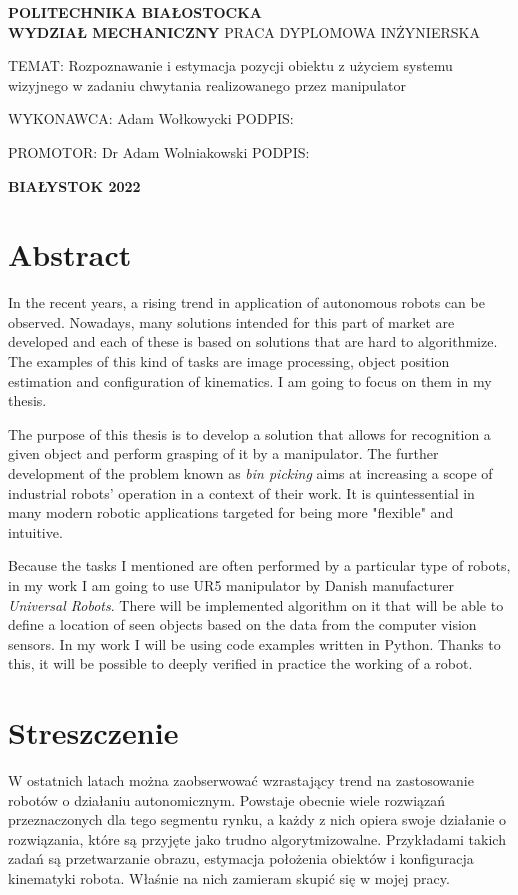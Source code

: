 \documentclass{article}
\newcommand\filling[1][4cm]{\makebox[#1]{\dotfill}}
\begin{document}
\begin{center}
\huge{\textbf{POLITECHNIKA BIAŁOSTOCKA}} \\
\LARGE{\textbf{WYDZIAŁ MECHANICZNY}} 
\vfill
\huge{PRACA DYPLOMOWA INŻYNIERSKA}
\vfill
\end{center}

\LARGE{TEMAT: Rozpoznawanie i estymacja pozycji obiektu z użyciem systemu wizyjnego w zadaniu chwytania realizowanego przez manipulator}
\vfill
\begin{flushright}
\LARGE{WYKONAWCA: Adam Wołkowycki}
\vfill
\LARGE{PODPIS: \filling[4cm]}
\vfill
\end{flushright}
\LARGE{PROMOTOR: Dr Adam Wolniakowski}
\vfill
\LARGE{PODPIS: \filling[4cm]}
\vfill
\Large{}

\begin{center}
\Large{\textbf{BIAŁYSTOK 2022}}
\end{center}
\thispagestyle{empty}

\newpage
\section*{\LARGE{Abstract}}
In the recent years, a rising trend in application of autonomous robots can be observed. Nowadays, many solutions intended for this part of market are developed and each of these is based on solutions that are hard to algorithmize. The examples of this kind of tasks are image processing, object position estimation and configuration of kinematics. I am going to focus on them in my thesis.

The purpose of this thesis is to develop a solution that allows for recognition a given object and perform grasping of it by a manipulator. The further development of the problem known as \emph{bin picking} aims at increasing a scope of industrial robots' operation in a context of their work. It is quintessential in many modern robotic applications targeted for being more "flexible" and intuitive.

Because the tasks I mentioned are often performed by a particular type of robots, in my work I am going to use UR5 manipulator by Danish manufacturer \emph{Universal Robots}. There will be implemented algorithm on it that will be able to define a location of seen objects based on the data from the computer vision sensors. In my work I will be using code examples written in Python. Thanks to this, it will be possible to deeply verified in practice the working of a robot.

\newpage
\section*{\LARGE{Streszczenie}}
W ostatnich latach można zaobserwować wzrastający trend na zastosowanie robotów o działaniu autonomicznym. Powstaje obecnie wiele rozwiązań przeznaczonych dla tego segmentu rynku, a każdy z nich opiera swoje działanie o rozwiązania, które są przyjęte jako trudno algorytmizowalne. Przykładami takich zadań są przetwarzanie obrazu, estymacja położenia obiektów i konfiguracja kinematyki robota. Właśnie na nich zamieram skupić się w mojej pracy.
\end{document}
